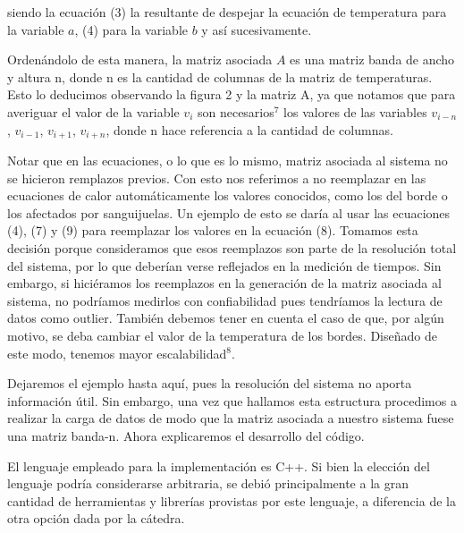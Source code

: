 siendo la ecuación (3) la resultante de despejar la ecuación de temperatura para la variable $a$, (4) para la variable $b$ y así sucesivamente.

Ordenándolo de esta manera, la matriz asociada $A$ es una matriz banda de ancho y altura n, donde n es la cantidad de columnas  de la matriz de temperaturas. Esto lo deducimos observando la figura 2 y la matriz A, ya que notamos que para averiguar el valor de la variable $v_{i}$ son necesarios$^7$ los valores de las variables $v_{i-n}$, $v_{i-1}$, $v_{i+1}$, $v_{i+n}$, donde n hace referencia a la cantidad de columnas. 

Notar que en las ecuaciones, o lo que es lo mismo, matriz asociada al sistema no se hicieron remplazos previos. Con esto nos referimos a no reemplazar en las ecuaciones de calor automáticamente los valores conocidos, como los del borde o los afectados por sanguijuelas. Un ejemplo de esto se daría al usar las ecuaciones (4), (7) y (9) para reemplazar los valores en la ecuación (8). Tomamos esta decisión porque consideramos que esos reemplazos son parte de la resolución total del sistema, por lo que deberían verse reflejados en la medición de tiempos. Sin embargo, si hiciéramos los reemplazos en la generación de la matriz asociada al sistema, no podríamos medirlos con confiabilidad pues tendríamos la lectura de datos como outlier. También debemos tener en cuenta el caso de que, por algún motivo, se deba cambiar el valor de la temperatura de los bordes. Dise\~nado de este modo, tenemos mayor escalabilidad$^8$. 

Dejaremos el ejemplo hasta aquí, pues la resolución del sistema no aporta información útil. Sin embargo, una vez que hallamos esta estructura procedimos a realizar la carga de datos de modo que la matriz asociada a nuestro sistema fuese una matriz banda-n. Ahora explicaremos el desarrollo del código.

El lenguaje empleado para la implementación es C++. Si bien la elección del lenguaje podría considerarse arbitraria, se debió principalmente a la gran cantidad de herramientas y librerías provistas por este lenguaje, a diferencia de la otra opción dada por la cátedra. 

